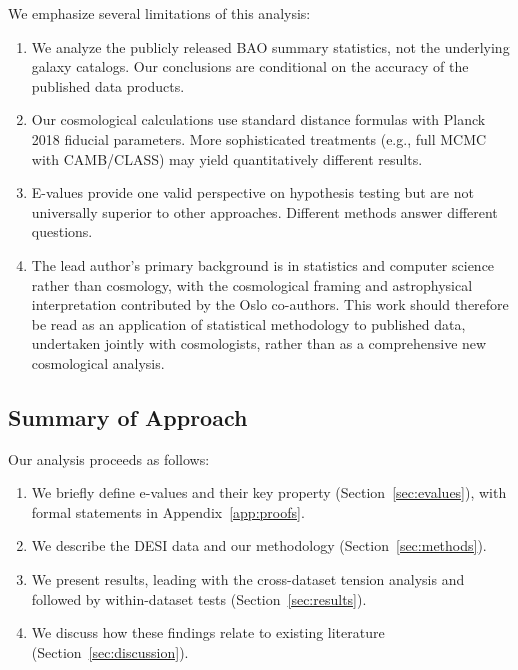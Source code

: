 \documentclass[11pt,a4paper]{article}
\begin{document}
We emphasize several limitations of this analysis:
\begin{enumerate}
    \item We analyze the publicly released BAO summary statistics, not the underlying galaxy catalogs. Our conclusions are conditional on the accuracy of the published data products.

    \item Our cosmological calculations use standard distance formulas with Planck 2018 fiducial parameters. More sophisticated treatments (e.g., full MCMC with CAMB/CLASS) may yield quantitatively different results.

    \item E-values provide one valid perspective on hypothesis testing but are not universally superior to other approaches. Different methods answer different questions.

    \item The lead author's primary background is in statistics and computer science rather than cosmology, with the cosmological framing and astrophysical interpretation contributed by the Oslo co-authors. This work should therefore be read as an application of statistical methodology to published data, undertaken jointly with cosmologists, rather than as a comprehensive new cosmological analysis.
\end{enumerate}

\subsection{Summary of Approach}

Our analysis proceeds as follows:
\begin{enumerate}
    \item We briefly define e-values and their key property (Section~\ref{sec:evalues}), with formal statements in Appendix~\ref{app:proofs}.

    \item We describe the DESI data and our methodology (Section~\ref{sec:methods}).

    \item We present results, leading with the cross-dataset tension analysis and followed by within-dataset tests (Section~\ref{sec:results}).

    \item We discuss how these findings relate to existing literature (Section~\ref{sec:discussion}).
\end{enumerate}
\end{document}
